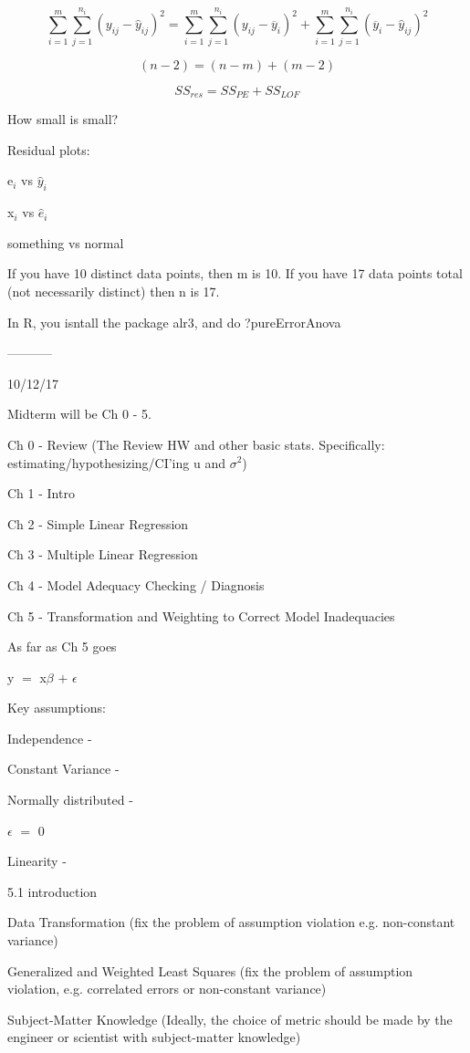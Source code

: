 \documentclass{article}
\newcommand{\mt}[1]{\ensuremath{#1}}
\newcommand{\ep}{\mt{\epsilon} }         %
\newcommand{\bta}{\mt{\beta} }
\newcommand{\ps}{\mt{\operatorname{+}} }
\newcommand{\eql}{ \mt{\operatorname{=}} }
\newcommand{\uw}[2]{#1\mt{_{#2}}}
\newcommand{\eqn}[1]{\[#1\]}
\newcommand{\txt}[1]{\text{#1}} %
\newcommand{\mn}[1]{\mt{\overline{#1}}}
\newcommand{\ssq}{\mt{\sigma^2}}
\newcommand{\exv}[1]{\txt{E[}#1\txt{]}}
\begin{document}
\eqn{\sum_{i = 1}^m\sum_{j = 1}^{n_i} (y_{ij} - \hat y_{ij})^2 = \sum_{i = 1}^m\sum_{j = 1}^{n_i} (y_{ij} - \mn{y}_{i})^2 + \sum_{i = 1}^m\sum_{j = 1}^{n_i} (\mn{y}_{i} - \hat y_{ij})^2}

\eqn{(n - 2) = (n - m) + (m - 2)}

\eqn{SS_{res} = SS_{PE} + SS_{LOF}}

How small is small?

Residual plots:

\uw{e}{i} vs $\hat y_i$

\uw{x}{i} vs $\hat e_i$

something vs normal 

If you have 10 distinct data points, then m is 10. If you have 17 data points total (not necessarily distinct) then n is 17.

In R, you isntall the package alr3, and do ?pureErrorAnova

-----------

10/12/17

Midterm will be Ch 0 - 5. 

Ch 0 - Review (The Review HW and other basic stats. Specifically: estimating/hypothesizing/CI'ing u and \ssq)

Ch 1 - Intro

Ch 2 - Simple Linear Regression

Ch 3 - Multiple Linear Regression

Ch 4 - Model Adequacy Checking / Diagnosis

Ch 5 - Transformation and Weighting to Correct Model Inadequacies

As far as Ch 5 goes

y \eql x\bta \ps \ep

Key assumptions:

Independence - 

Constant Variance -

Normally distributed - 

\exv{\ep} \eql 0

Linearity - 

5.1 introduction

Data Transformation (fix the problem of assumption violation e.g. non-constant variance)

Generalized and Weighted Least Squares (fix the problem of assumption violation, e.g. correlated errors or non-constant variance)

Subject-Matter Knowledge (Ideally, the choice of metric should be made by the engineer or scientist with subject-matter knowledge)
\end{document}
